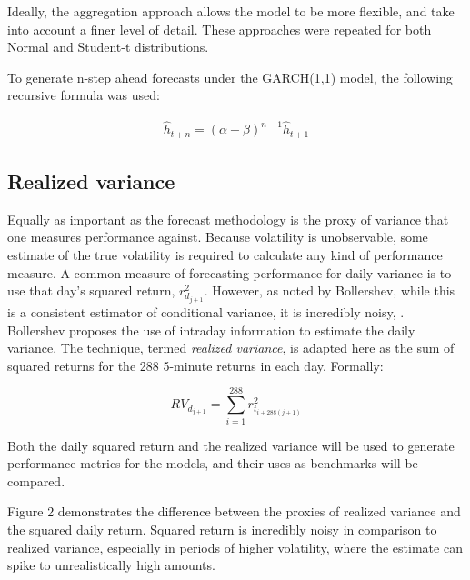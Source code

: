 \documentclass[10pt,twoside,printwatermark=false]{pinp}
\begin{document}
Ideally, the aggregation approach allows the model to be more flexible,
and take into account a finer level of detail. These approaches were
repeated for both Normal and Student-t distributions.

To generate n-step ahead forecasts under the GARCH(1,1) model, the
following recursive formula was used:

\begin{equation}
  \begin{aligned}
\hat{h}_{t+n} = (\alpha + \beta)^{n-1} \hat{h}_{t+1}
       \label{eqn:forecast} 
  \end{aligned}
\end{equation}

\subsection{Realized variance}\label{realized-variance}

Equally as important as the forecast methodology is the proxy of
variance that one measures performance against. Because volatility is
unobservable, some estimate of the true volatility is required to
calculate any kind of performance measure. A common measure of
forecasting performance for daily variance is to use that day's squared
return, \(r_{d_{j+1}}^2\). However, as noted by Bollershev, while this
is a consistent estimator of conditional variance, it is incredibly
noisy, \cite{Garch}. Bollershev proposes the use of intraday information
to estimate the daily variance. The technique, termed \emph{realized
variance}, is adapted here as the sum of squared returns for the 288
5-minute returns in each day. Formally:

\[ RV_{d_{j+1}} = \sum_{i = 1}^{288} r_{t_{i + 288(j+1)}}^2 \]

Both the daily squared return and the realized variance will be used to
generate performance metrics for the models, and their uses as
benchmarks will be compared.

Figure 2 demonstrates the difference between the proxies of realized
variance and the squared daily return. Squared return is incredibly
noisy in comparison to realized variance, especially in periods of
higher volatility, where the estimate can spike to unrealistically high
amounts.
\end{document}
